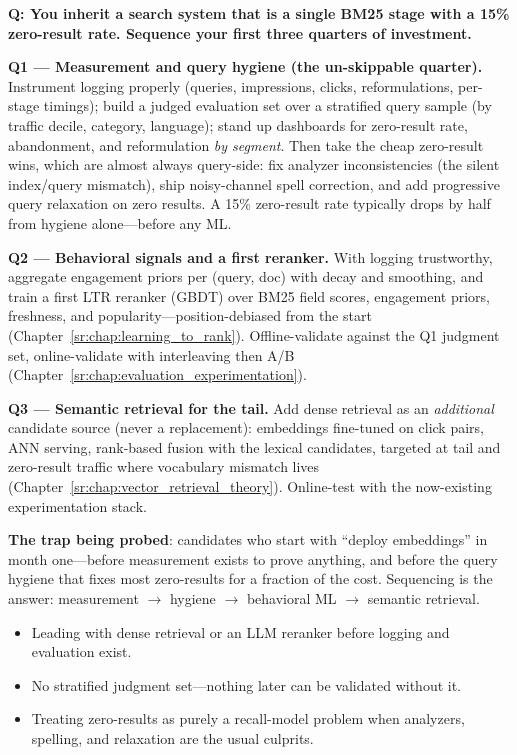 \begin{interviewq}
\textbf{Q: You inherit a search system that is a single BM25 stage with a 15\% zero-result rate. Sequence your first three quarters of investment.}

 \quad {} \quad \badgefreq{\freqmed}

\stronganswer

\textbf{Q1 --- Measurement and query hygiene (the un-skippable quarter).} Instrument logging properly (queries, impressions, clicks, reformulations, per-stage timings); build a judged evaluation set over a stratified query sample (by traffic decile, category, language); stand up dashboards for zero-result rate, abandonment, and reformulation \textit{by segment}. Then take the cheap zero-result wins, which are almost always query-side: fix analyzer inconsistencies (the silent index/query mismatch), ship noisy-channel spell correction, and add progressive query relaxation on zero results. A 15\% zero-result rate typically drops by half from hygiene alone---before any ML.

\textbf{Q2 --- Behavioral signals and a first reranker.} With logging trustworthy, aggregate engagement priors per (query, doc) with decay and smoothing, and train a first LTR reranker (GBDT) over BM25 field scores, engagement priors, freshness, and popularity---position-debiased from the start (Chapter~\ref{sr:chap:learning_to_rank}). Offline-validate against the Q1 judgment set, online-validate with interleaving then A/B (Chapter~\ref{sr:chap:evaluation_experimentation}).

\textbf{Q3 --- Semantic retrieval for the tail.} Add dense retrieval as an \textit{additional} candidate source (never a replacement): embeddings fine-tuned on click pairs, ANN serving, rank-based fusion with the lexical candidates, targeted at tail and zero-result traffic where vocabulary mismatch lives (Chapter~\ref{sr:chap:vector_retrieval_theory}). Online-test with the now-existing experimentation stack.

\textbf{The trap being probed}: candidates who start with ``deploy embeddings'' in month one---before measurement exists to prove anything, and before the query hygiene that fixes most zero-results for a fraction of the cost. Sequencing is the answer: measurement $\to$ hygiene $\to$ behavioral ML $\to$ semantic retrieval.

\redflags
\begin{itemize}
    \item Leading with dense retrieval or an LLM reranker before logging and evaluation exist.
    \item No stratified judgment set---nothing later can be validated without it.
    \item Treating zero-results as purely a recall-model problem when analyzers, spelling, and relaxation are the usual culprits.
\end{itemize}


\end{interviewq}
